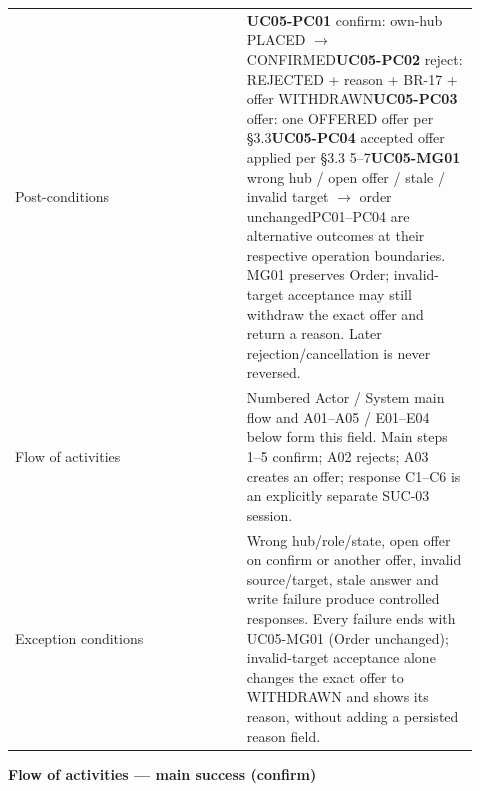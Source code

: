 \begin{longtable}{>{\raggedright\arraybackslash}p{0.4600\linewidth}>{\raggedright\arraybackslash}p{0.4600\linewidth}}
Post-conditions & \textbf{UC05-PC01} confirm: own-hub PLACED \ensuremath{\rightarrow} CONFIRMED\newline{}\textbf{UC05-PC02} reject: REJECTED + reason + BR-17 + offer WITHDRAWN\newline{}\textbf{UC05-PC03} offer: one OFFERED offer per \S{}3.3\newline{}\textbf{UC05-PC04} accepted offer applied per \S{}3.3 5--7\newline{}\textbf{UC05-MG01} wrong hub / open offer / stale / invalid target \ensuremath{\rightarrow} order unchanged\newline{}PC01--PC04 are alternative outcomes at their respective operation boundaries. MG01 preserves Order; invalid-target acceptance may still withdraw the exact offer and return a reason. Later rejection/cancellation is never reversed. \\
Flow of activities & Numbered Actor / System main flow and A01--A05 / E01--E04 below form this field. Main steps 1--5 confirm; A02 rejects; A03 creates an offer; response C1--C6 is an explicitly separate SUC-03 session. \\
Exception conditions & Wrong hub/role/state, open offer on confirm or another offer, invalid source/target, stale answer and write failure produce controlled responses. Every failure ends with UC05-MG01 (Order unchanged); invalid-target acceptance alone changes the exact offer to WITHDRAWN and shows its reason, without adding a persisted reason field. \\
\end{longtable}
\textbf{Flow of activities --- main success (confirm)}

